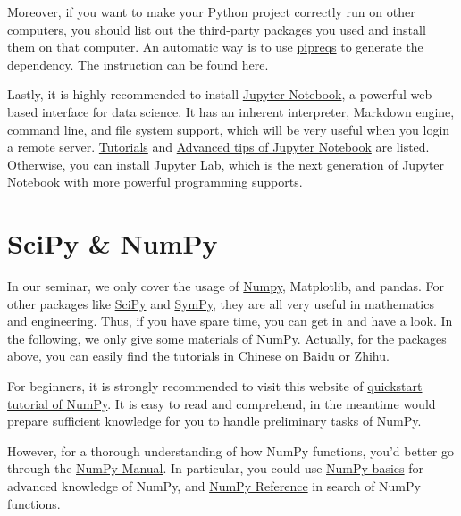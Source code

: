 \documentclass[english]{../TexTemplate/thesis}
\begin{document}
Moreover, if you want to make your Python project correctly run on other computers, you should list out the third-party packages you used and install them on that computer. An automatic way is to use \href{https://github.com/bndr/pipreqs}{pipreqs} to generate the dependency. The instruction can be found \href{https://dev.to/bhupesh/pipreqs-automatically-generate-python-dependencies-30nl}{here}.

Lastly, it is highly recommended to install \href{https://jupyter.org/}{Jupyter Notebook}, a powerful web-based interface for data science. It has an inherent interpreter, Markdown engine, command line, and file system support, which will be very useful when you login a remote server. \href{https://www.dataquest.io/blog/jupyter-notebook-tutorial/}{Tutorials} and \href{http://liuchengxu.org/pelican-blog/jupyter-notebook-tips.html}{Advanced tips of Jupyter Notebook} are listed. Otherwise, you can install \href{https://jupyter.org/}{Jupyter Lab}, which is the next generation of Jupyter Notebook with more powerful programming supports.

\section{SciPy \& NumPy}
In our seminar, we only cover the usage of \href{https://numpy.org/}{Numpy}, Matplotlib, and pandas.
For other packages like \href{https://docs.scipy.org/doc/scipy/reference/tutorial/index.html}{SciPy} and \href{http://docs.sympy.org/latest/tutorial/index.html}{SymPy}, they are all very useful in mathematics and engineering. Thus, if you have spare time, you can get in and have a look.
In the following, we only give some materials of NumPy.
Actually, for the packages above, you can easily find the tutorials in Chinese on Baidu or Zhihu.

For beginners, it is strongly recommended to visit this website of \href{https://docs.scipy.org/doc/numpy/user/quickstart.html}{quickstart tutorial of NumPy}. It is easy to read and comprehend, in the meantime would prepare sufficient knowledge for you to handle preliminary tasks of NumPy.

However, for a thorough understanding of how NumPy functions, you'd better go through the \href{https://docs.scipy.org/doc/numpy/index.html}{NumPy Manual}. In particular, you could use \href{https://docs.scipy.org/doc/numpy/user/basics.html}{NumPy basics} for advanced knowledge of NumPy, and \href{https://docs.scipy.org/doc/numpy/reference/index.html}{NumPy Reference} in search of NumPy functions.
\end{document}

